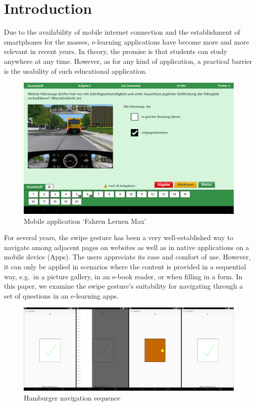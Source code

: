 \documentclass{sig-alternate-05-2015}
\begin{document}
\section{Introduction}
Due to the availability of mobile internet connection and the establishment of
smartphones for the masses, e-learning applications have become more and more relevant in recent years.  In theory, the promise is that students can study anywhere at any time. However, as for any kind of application, a practical barrier is the usability of such educational application.
\begin{figure}[h]
	\includegraphics[width=\columnwidth]{drivinglicense.png}
	\caption{Mobile application `Fahren Lernen Max'}\label{fig:fahren_lernen}
\end{figure}
For several years, the swipe gesture has been a very well-established way to
navigate among adjacent pages on websites as well as in native applications on a mobile device (Apps). The users appreciate its ease and comfort of use. However,
it can only be applied in scenarios where the content is provided in a
sequential way, e.g.\ in a picture gallery, in an e-book reader, or when
filling in a form. In this paper, we examine the swipe gesture's suitability
for navigating through a set of questions in an e-learning apps.
\begin{figure}[!h]
	\centering
	\includegraphics[width=\linewidth]{pics/screenshots/sequence}
	\caption{Hamburger navigation sequence}\label{fig:sequence}
\end{figure}
\end{document}
